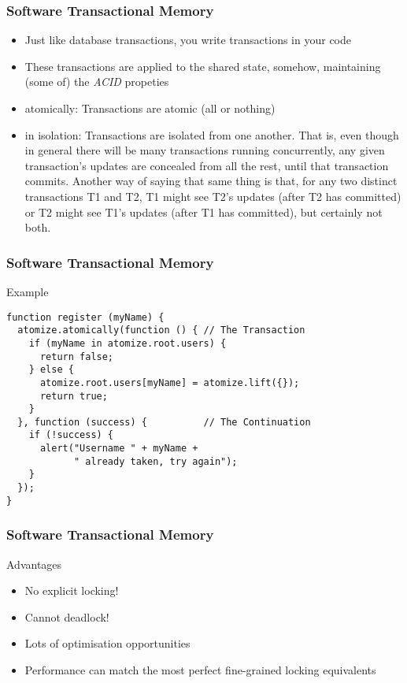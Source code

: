 \documentclass{beamer}
\begin{document}
\begin{frame}
  \frametitle{Software Transactional Memory}

  \begin{block}{}
    \begin{itemize}
    \item
      Just like database transactions, you write transactions in your code
    \item
      These transactions are applied to the shared state, somehow,
      maintaining (some of) the {\em ACID} propeties
    \item
      atomically: Transactions are atomic (all or nothing)
    \item
      in isolation: Transactions are isolated from one another. That
      is, even though in general there will be many transactions
      running concurrently, any given transaction's updates are
      concealed from all the rest, until that transaction
      commits. Another way of saying that same thing is that, for any
      two distinct transactions T1 and T2, T1 might see T2's updates
      (after T2 has committed) or T2 might see T1's updates (after T1
      has committed), but certainly not both.
    \end{itemize}
  \end{block}
\end{frame}

\begin{frame}[fragile]
  \frametitle{Software Transactional Memory}

  \begin{block}{Example}
    \begin{verbatim}
function register (myName) {
  atomize.atomically(function () { // The Transaction
    if (myName in atomize.root.users) {
      return false;
    } else {
      atomize.root.users[myName] = atomize.lift({});
      return true;
    }
  }, function (success) {          // The Continuation
    if (!success) {
      alert("Username " + myName +
            " already taken, try again");
    }
  });
}
    \end{verbatim}
  \end{block}
\end{frame}

\begin{frame}
  \frametitle{Software Transactional Memory}

  \begin{block}{Advantages}
    \begin{itemize}
    \item
      No explicit locking!
    \item
      Cannot deadlock!
    \item
      Lots of optimisation opportunities
    \item
      Performance can match the most perfect fine-grained locking equivalents
    \end{itemize}
  \end{block}
\end{frame}
\end{document}

